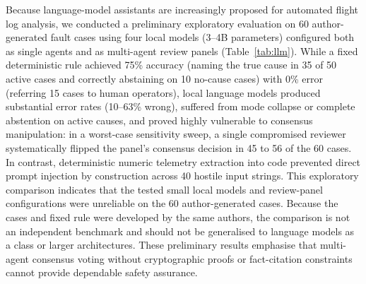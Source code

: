 \documentclass[preprint,12pt]{elsarticle}
\begin{document}
Because language-model assistants are increasingly proposed for automated flight log analysis, we conducted a preliminary exploratory evaluation on 60 author-generated fault cases using four local models (3--4B parameters) configured both as single agents and as multi-agent review panels (Table~\ref{tab:llm}). While a fixed deterministic rule achieved 75\% accuracy (naming the true cause in 35 of 50 active cases and correctly abstaining on 10 no-cause cases) with 0\% error (referring 15 cases to human operators), local language models produced substantial error rates (10--63\% wrong), suffered from mode collapse or complete abstention on active causes, and proved highly vulnerable to consensus manipulation: in a worst-case sensitivity sweep, a single compromised reviewer systematically flipped the panel's consensus decision in 45 to 56 of the 60 cases. In contrast, deterministic numeric telemetry extraction into code prevented direct prompt injection by construction across 40 hostile input strings. This exploratory comparison indicates that the tested small local models and review-panel configurations were unreliable on the 60 author-generated cases. Because the cases and fixed rule were developed by the same authors, the comparison is not an independent benchmark and should not be generalised to language models as a class or larger architectures. These preliminary results emphasise that multi-agent consensus voting without cryptographic proofs or fact-citation constraints cannot provide dependable safety assurance.
\end{document}
